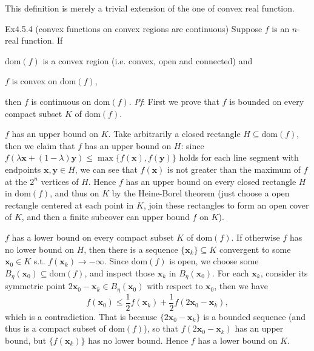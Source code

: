 \documentclass{article}
\begin{document}
\begin{Rmk}{}
    This definition is merely a trivial extension of the one of convex real function.
\end{Rmk}

\begin{Th}{Ex4.5.4 (convex functions on convex regions are continuous)}
    Suppose $f$ is an $n$-real function. If
    \begin{compactenum}
        \item $\text{dom}(f)$ is a convex region (i.e. convex, open and connected) and
        \item $f$ is convex on $\text{dom}(f)$,
    \end{compactenum}
    then $f$ is continuous on $\text{dom}(f)$.
    \tcblower
    \textit{Pf}: First we prove that $f$ is bounded on every compact subset $K$ of $\text{dom}(f)$. 
    \begin{compactenum}
        \item $f$ has an upper bound on $K$. Take arbitrarily a closed rectangle $H\subseteq\text{dom}(f)$, then we claim that $f$ has an upper bound on $H$: since $f(\lambda\pmb{x}+(1-\lambda)\pmb{y})\leq\max\{f(\pmb{x}), f(\pmb{y})\}$ holds for each line segment with endpoints $\pmb{x}, \pmb{y}\in H$, we can see that $f(\pmb{x})$ is not greater than the maximum of $f$ at the $2^n$ vertices of $H$. Hence $f$ has an upper bound on every closed rectangle $H$ in $\text{dom}(f)$, and thus on $K$ by the Heine-Borel theorem (just choose a open rectangle centered at each point in $K$, join these rectangles to form an open cover of $K$, and then a finite subcover can upper bound $f$ on $K$).
        \item $f$ has a lower bound on every compact subset $K$ of $\text{dom}(f)$. If otherwise $f$ has no lower bound on $H$, then there is a sequence $\{\pmb{x}_k\}\subseteq K$ convergent to some $\pmb{x}_0\in K$ s.t. $f(\pmb{x}_k)\rightarrow -\infty$. Since $\text{dom}(f)$ is open, we choose some $B_\eta(\pmb{x}_0)\subseteq\text{dom}(f)$, and inspect those $\pmb{x}_k$ in $B_\eta(\pmb{x}_0)$. For each $\pmb{x}_k$, consider its symmetric point $2\pmb{x}_0-\pmb{x}_k\in B_\eta(\pmb{x}_0)$ with respect to $\pmb{x}_0$, then we have
        $$ f(\pmb{x}_0)\leq \frac{1}{2}f(\pmb{x}_k)+\frac{1}{2}f(2\pmb{x}_0-\pmb{x}_k), $$
        which is a contradiction. That is because $\{2\pmb{x}_0-\pmb{x}_k\}$ is a bounded sequence (and thus is a compact subset of $\text{dom}(f)$), so that $f(2\pmb{x}_0-\pmb{x}_k)$ has an upper bound, but $\{f(\pmb{x}_k)\}$ has no lower bound. Hence $f$ has a lower bound on $K$.

\end{compactenum}
\end{Th}
\end{document}
